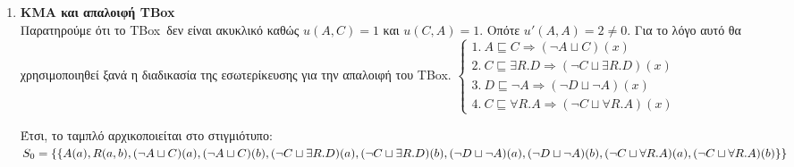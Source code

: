 \documentclass[10pt]{article}
\newcommand{\lat}{\foreignlanguage{english}}
\newcommand{\ABox}{\foreignlanguage{english}{ABox}}
\newcommand{\TBox}{\foreignlanguage{english}{TBox}}
\newcommand{\yp}{\sqsubseteq}
\newcommand{\h}{\sqcup}
\begin{document}
\begin{enumerate}
\begin{enumerate}
			\item Κανόνας $K_{\exists}$ και εσωτερίκευση:\\\\ $S_4 = \{ \{(A \h \exists R.B)(a) , A(a)\} ,\\ \{(A \h \exists R.B)(a), (\exists R.B)(a), R(a, x_1), B(x_1), (A \h \exists R.B)(x_1) , A(x_1) \} ,\\ \{(A \h \exists R.B)(a), (\exists R.B)(a), R(a, x_1), B(x_1), (A \h \exists R.B)(x_1) , (\exists R.B)(x_1), R(x_1, x_2), B(x_2), (A \h \exists R.B)(x_2) \} \}$\\
			
			\item \lat{Blocking}: ο αλγόριθμος παρατηρεί ότι το πλήθος των νέων παιδών με την εφαρμογή του προηγούμενου βήματος είναι τρία. Το ίδιο ισχύει και όταν εφαρμόστηκε ο κανόνας $K_{\exists}$ σε συνδιασμό με την ιδιότητα της εσωτερίκευσης για το $x_1$. Επομένως, σταματάει η επέκταση του ταμπλό και θεωρείται πλήρες.

		\end{enumerate}
		
		\textbf{Εύρεση \ABox \ το οποίο δεν περιέχει αντιφάσεις}\\
		Κατευθείαν βλέπουμε ότι το πρώτο \ABox \ του ταμπλό $S_4$ δεν παρουσιάζει αντιφάσεις. Επομένως, ισχύει η πρόταση $\neg A \yp \exists R.B$ για το \TBox \ $\forall R. \neg B \yp A$.
		
		\item \textbf{ΚΜΑ και απαλοιφή \TBox} \\
		Παρατηρούμε ότι το \TBox \ δεν είναι ακυκλικό καθώς $u(A, C) = 1$ και $u(C, A) = 1$. Οπότε $u'(A, A) = 2 \neq 0$. Για το λόγο αυτό θα χρησιμοποιηθεί ξανά η διαδικασία της εσωτερίκευσης για την απαλοιφή του \TBox.
		$
		\begin{cases}
		1.\ A \yp C \Rightarrow (\neg A \h C)(x) \\
		2.\ C \yp \exists R.D \Rightarrow (\neg C \h \exists R.D)(x) \\
		3.\ D \yp \neg A \Rightarrow (\neg D \h \neg A)(x) \\
		4.\ C \yp \forall R.A \Rightarrow (\neg C \h \forall R.A)(x)
		\end{cases}
		$
		
		Έτσι, το ταμπλό αρχικοποιείται στο στιγμιότυπο: $S_0 = \{\{A(a), R(a, b), (\neg A \h C)(a), (\neg A \h C)(b), (\neg C \h \exists R.D)(a),\\ (\neg C \h \exists R.D)(b), (\neg D \h \neg A)(a), (\neg D \h \neg A)(b), (\neg C \h \forall R.A)(a), (\neg C \h \forall R.A)(b)\} \}$\\
		

\end{enumerate}
\end{document}
